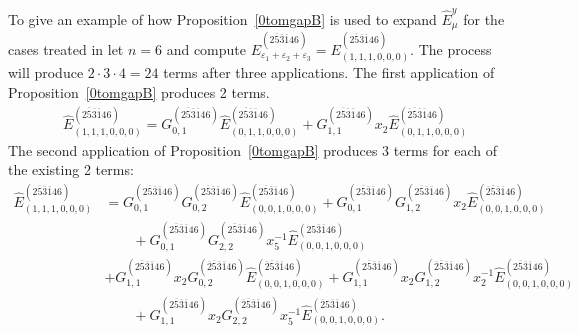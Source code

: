 \documentclass[11pt]{article}
\theoremstyle{plain}
\theoremstyle{definition}
\theoremstyle{remark}
\numberwithin{equation}{section}
\newcounter{r}
\newcounter{s}
\begin{document}
To give an example of how Proposition~\ref{0tomgapB} is used to expand $\widehat{E}^y_\mu$ for the cases treated in 
\cite[Theorem 1.10]{CMW23}
let $n=6$ and compute $E^{(2\overline{5}\overline{3}\overline{1}46)}_{\varepsilon_1+\varepsilon_2+\varepsilon_3}=E^{(2\overline{5}\overline{3}\overline{1}46)}_{(1,1,1,0,0,0)}$.  
The process will produce $2\cdot3\cdot4 = 24$ terms after three applications.
The first application of Proposition~\ref{0tomgapB} produces 2 terms.
\begin{align*}
&\widehat{E}^{(2\overline{5}\overline{3}\overline{1}46)}_{(1,1,1,0,0,0)}
=G_{0,1}^{(2\overline{5}\overline{3}\overline{1}46)}\widehat{E}^{(2\overline{5}\overline{3}\overline{1}46)}_{(0,1,1,0,0,0)}
+G_{1,1}^{(2\overline{5}\overline{3}\overline{1}46)}x_2\widehat{E}^{(\overline{2}\overline{5}\overline{3}\overline{1}46)}_{(0,1,1,0,0,0)}
\end{align*}
The second application of Proposition~\ref{0tomgapB} produces 3 terms for each of the existing 2 terms:
\begin{align*}
\widehat{E}^{(2\overline{5}\overline{3}\overline{1}46)}_{(1,1,1,0,0,0)}
&=G_{0,1}^{(2\overline{5}\overline{3}\overline{1}46)}
G_{0,2}^{(2\overline{5}\overline{3}\overline{1}46)}\widehat{E}^{(2\overline{5}\overline{3}\overline{1}46)}_{(0,0,1,0,0,0)}
+G_{0,1}^{(2\overline{5}\overline{3}\overline{1}46)}
G_{1,2}^{(2\overline{5}\overline{3}\overline{1}46)}x_2
\widehat{E}^{(\overline{2}\overline{5}\overline{3}\overline{1}46)}_{(0,0,1,0,0,0)}
\\
&\qquad
+G_{0,1}^{(2\overline{5}\overline{3}\overline{1}46)}
G_{2,2}^{(2\overline{5}\overline{3}\overline{1}46)}x_5^{-1}
\widehat{E}^{(25\overline{3}\overline{1}46)}_{(0,0,1,0,0,0)}
\\
&+G_{1,1}^{(2\overline{5}\overline{3}\overline{1}46)} x_2
G_{0,2}^{(\overline{2}\overline{5}\overline{3}\overline{1}46)}
\widehat{E}^{(\overline{2}\overline{5}\overline{3}\overline{1}46)}_{(0,0,1,0,0,0)}
+G_{1,1}^{(2\overline{5}\overline{3}\overline{1}46)} x_2
G_{1,2}^{(\overline{2}\overline{5}\overline{3}\overline{1}46)} x_2^{-1} 
\widehat{E}^{(2\overline{5}\overline{3}\overline{1}46)}_{(0,0,1,0,0,0)}
\\
&\qquad
+G_{1,1}^{(2\overline{5}\overline{3}\overline{1}46)} x_2
G_{2,2}^{(\overline{2}\overline{5}\overline{3}\overline{1}46)} x_5^{-1}
\widehat{E}^{(\overline{2}5\overline{3}\overline{1}46)}_{(0,0,1,0,0,0)}.
\end{align*}
\end{document}
